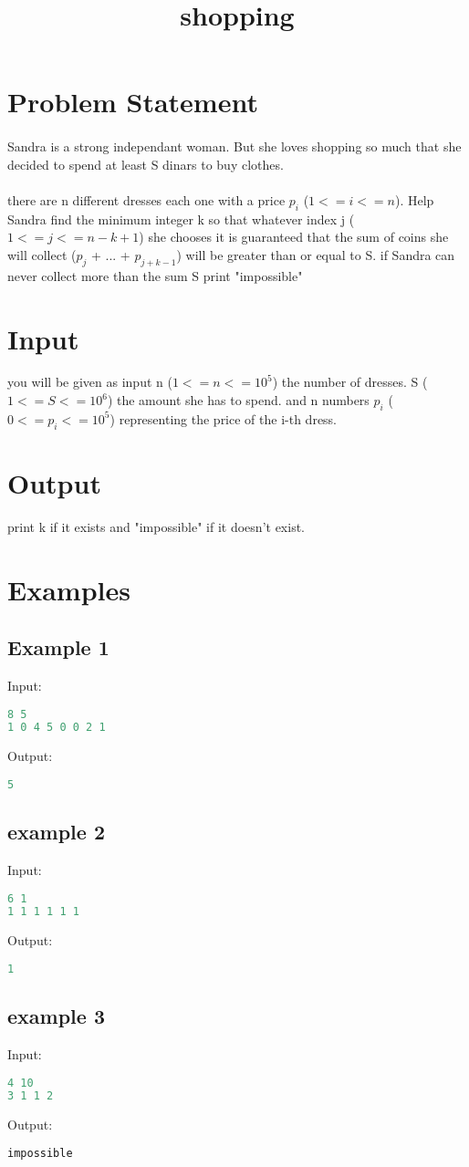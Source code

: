 \documentclass[8pt]{article}
\begin{document}
\title{shopping}
 \date{}
\maketitle

\section{Problem Statement}
\paragraph{}
Sandra is a strong independant woman. But she loves shopping so much that she decided to spend at least S dinars to buy clothes.
\paragraph{}
there are n different dresses each one with a price $p_i$ ($1<=i<=n$).
Help Sandra find the minimum integer k so that whatever index j ($1<=j<=n-k+1$) she chooses it is guaranteed 
that the sum of coins she will collect ($p_j$ + ... + $p_{j+k-1}$) will be greater than or equal to S.
if Sandra can never collect more than the sum S print "impossible"
\section{Input}
you will be given as input n ($1<=n<=10^5$) the number of dresses. S ($1<=S<=10^6$) the amount she has to spend.
and n numbers $p_i$ ($0<=p_i<=10^5$) representing the price of the i-th dress.
\section{Output}
print k if it exists and "impossible" if it doesn't exist.

\section{Examples}
\subsection{Example 1}
Input:
\begin{lstlisting}[language=Python]
8 5
1 0 4 5 0 0 2 1
\end{lstlisting}
Output:
\begin{lstlisting}[language=Python]
5
\end{lstlisting}
\subsection{example 2}
Input:
\begin{lstlisting}[language=Python]
6 1
1 1 1 1 1 1
\end{lstlisting}
Output:
\begin{lstlisting}[language=Python]
1
\end{lstlisting}
\subsection{example 3}
Input:
\begin{lstlisting}[language=Python]
4 10
3 1 1 2
\end{lstlisting}
Output:
\begin{lstlisting}[language=Python]
impossible
\end{lstlisting}
\end{document}
